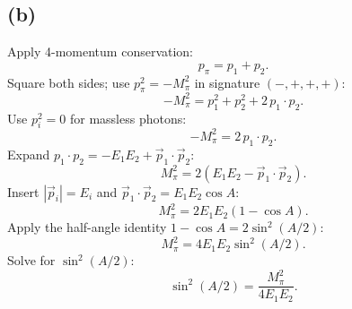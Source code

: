 \documentclass[11pt]{article}
\begin{document}
\subsection*{(b)}
Apply 4-momentum conservation:
\[ p_{\pi}=p_{1}+p_{2}. \]
Square both sides; use $p_{\pi}^{2}=-M_{\pi}^{2}$ in signature $(-,+,+,+)$:
\[ -M_{\pi}^{2}=p_{1}^{2}+p_{2}^{2}+2\,p_{1}\!\cdot\!p_{2}. \]
Use $p_{i}^{2}=0$ for massless photons:
\[ -M_{\pi}^{2}=2\,p_{1}\!\cdot\!p_{2}. \]
Expand $p_{1}\!\cdot\!p_{2}=-E_{1}E_{2}+\vec p_{1}\!\cdot\!\vec p_{2}$:
\[ M_{\pi}^{2}=2(E_{1}E_{2}-\vec p_{1}\!\cdot\!\vec p_{2}). \]
Insert $|\vec p_{i}|=E_{i}$ and $\vec p_{1}\!\cdot\!\vec p_{2}=E_{1}E_{2}\cos A$:
\[ M_{\pi}^{2}=2E_{1}E_{2}(1-\cos A). \]
Apply the half-angle identity $1-\cos A=2\sin^{2}(A/2)$:
\[ M_{\pi}^{2}=4E_{1}E_{2}\sin^{2}(A/2). \]
Solve for $\sin^{2}(A/2)$:
\begin{equation} \boxed{\;\sin^{2}(A/2)=\frac{M_{\pi}^{2}}{4E_{1}E_{2}}.\;} \label{eq:sinA-half} \end{equation}
\end{document}
